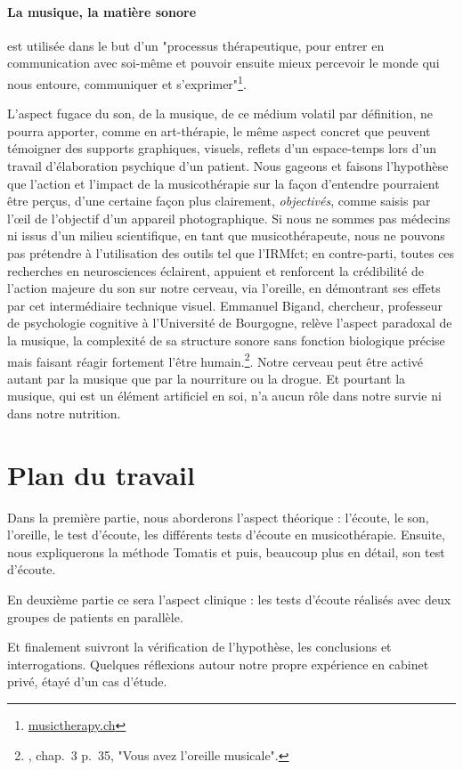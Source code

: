 \paragraph{La musique, la matière sonore} est utilisée dans le but d'un "processus
thérapeutique, pour entrer en communication avec soi-même et pouvoir ensuite mieux percevoir le monde qui nous
entoure, communiquer et s'exprimer"\footnote{%
 \href{http://www.musictherapy.ch/fr/musicotherapie/quest-ce-que-la-musicotherapie/}{musictherapy.ch}}.

L'aspect fugace du son, de la musique, de ce médium volatil par
définition, ne pourra apporter, comme en art-thérapie, le
même aspect concret que peuvent témoigner des supports graphiques,
visuels, reflets d'un espace-temps lors d'un travail d'élaboration
psychique d'un patient. Nous gageons et faisons l'hypothèse que l'action et l'impact de la
musicothérapie sur la façon d'entendre pourraient être perçus, d'une certaine façon plus
clairement, \textsl{ objectivés}, comme saisis par l'\oe il de l'objectif d'un appareil
photographique.
Si nous ne sommes pas médecins ni issus d'un milieu scientifique, en tant que musicothérapeute, nous ne pouvons pas prétendre à l'utilisation des outils
 tel que l'IRMfct; en contre-parti, toutes ces recherches en
neurosciences éclairent, appuient et renforcent la crédibilité de l'action
majeure du son sur notre cerveau, via l'oreille, en démontrant ses effets par cet intermédiaire technique visuel.  Emmanuel Bigand, chercheur, professeur de
psychologie cognitive à l'Université de Bourgogne, relève l'aspect
paradoxal de la musique, la complexité de sa structure sonore sans
fonction biologique précise mais faisant réagir fortement l'être
humain.\footnote{\cite{AuteurInconnu2011}, chap.~3 p.~35, "Vous avez l'oreille musicale".}.  Notre cerveau peut être activé autant par
la musique que par la nourriture ou la drogue. Et pourtant la musique,
qui est un élément artificiel en soi, n'a aucun rôle dans notre survie ni dans
notre nutrition.


\section{Plan du travail}

Dans la première partie, nous aborderons l'aspect théorique : l'écoute, le son, l'oreille, le test d'écoute, les différents tests d'écoute en musicothérapie.  Ensuite, nous expliquerons  la méthode Tomatis
et puis, beaucoup plus en détail, son test d'écoute.

En deuxième partie ce sera l'aspect clinique : les tests d'écoute réalisés  avec deux groupes de patients en parallèle.

Et finalement suivront la vérification de l'hypothèse, les conclusions et interrogations. 
Quelques réflexions autour notre propre expérience en cabinet privé, étayé d'un cas d'étude.
